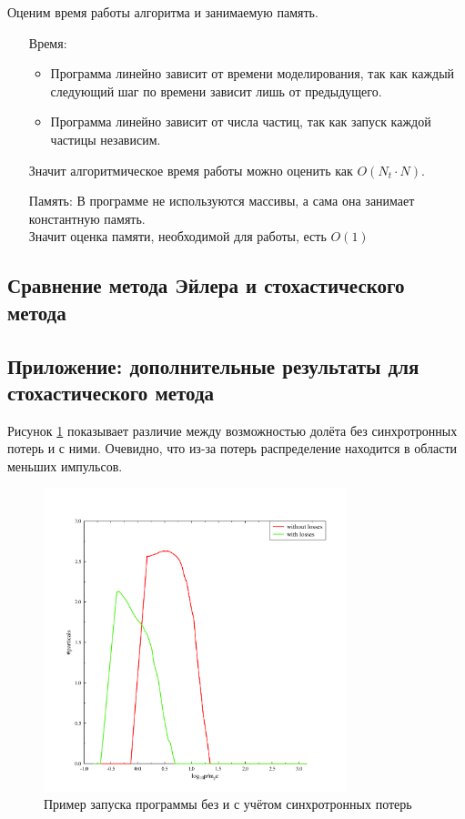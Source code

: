 \documentclass[a4paper,14pt]{extarticle} %
\begin{document}
Оценим время работы алгоритма и занимаемую память.
\begin{enumerate}
\item[Время:] 
\begin{itemize}
\item Программа линейно зависит от времени моделирования, так как каждый следующий шаг по времени зависит лишь от предыдущего.
\item Программа линейно зависит от числа частиц, так как запуск каждой частицы независим.
\end{itemize}
Значит алгоритмическое время работы можно оценить как $O(N_t\cdot N)$.
\item[Память:] В программе не используются массивы, а сама она занимает константную память.\\
Значит оценка памяти, необходимой для работы, есть $O(1)$
\end{enumerate}


\subsection{Сравнение метода Эйлера и стохастического метода}

\subsection{Приложение: дополнительные результаты для стохастического метода}
Рисунок \ref{res/stoh/sinh} показывает различие между возможностью долёта без синхротронных потерь и с ними. Очевидно, что из-за потерь распределение находится в области меньших импульсов. 
\begin{figure}[!htb]
\centering
\includegraphics[width=250pt]{stoh_sinh_or_not}
\caption{Пример запуска программы без и с учётом синхротронных потерь}
\label{res/stoh/sinh}
\end{figure}
\end{document}
